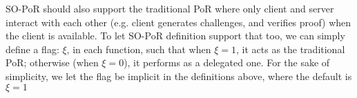 \begin{remark}
SO-PoR should also support  the traditional PoR where only client and server interact with each other  (e.g. client generates challenges, and verifies proof) when the client is available. To let SO-PoR definition support that too, we can simply define a flag: $\xi$, in each function, such that  when $\xi=1$, it acts as the traditional PoR; otherwise (when $\xi=0$), it performs as a delegated one. For the sake of simplicity, we let the flag  be implicit in the definitions above, where the default  is  $\xi=1$ 
\end{remark}
